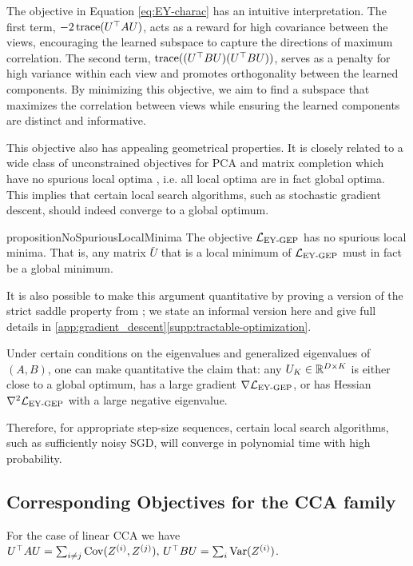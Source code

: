 The objective in Equation \eqref{eq:EY-charac} has an intuitive interpretation. The first term, $-2 \operatorname{trace}(U^\top A U)$, acts as a reward for high covariance between the views, encouraging the learned subspace to capture the directions of maximum correlation. The second term, $\operatorname{trace}((U^\top B U)(U^\top B U))$, serves as a penalty for high variance within each view and promotes orthogonality between the learned components. By minimizing this objective, we aim to find a subspace that maximizes the correlation between views while ensuring the learned components are distinct and informative.

This objective also has appealing geometrical properties. 
It is closely related to a wide class of unconstrained objectives for PCA and matrix completion which have no spurious local optima \citep{ge_no_2017}, i.e. all local optima are in fact global optima. 
This implies that certain local search algorithms, such as stochastic gradient descent, should indeed converge to a global optimum.

\begin{restatable}{proposition}{NoSpuriousLocalMinima}\label{prop:no-spurious}
    The objective $\mathcal{L}_\text{EY-GEP}$ has no spurious local minima.
    That is, any matrix $\bar{U}$ that is a local minimum of $\mathcal{L}_\text{EY-GEP}$ must in fact be a global minimum.
\end{restatable}

It is also possible to make this argument quantitative by proving a version of the strict saddle property from \citet{ge_no_2017,ge2015escaping}; we state an informal version here and give full details in \ref{app:gradient_descent}\ref{supp:tractable-optimization}.

\begin{corollary}
    Under certain conditions on the eigenvalues and generalized eigenvalues of $(A,B)$, one can make quantitative the claim that:
    any $U_K \in \mathbb{R}^{D \times K}$ is either close to a global optimum, has a large gradient $\nabla \mathcal{L}_\text{EY-GEP}$, or has Hessian $\nabla^2 \mathcal{L}_\text{EY-GEP}$ with a large negative eigenvalue.
    
    Therefore, for appropriate step-size sequences, certain local search algorithms, such as sufficiently noisy SGD, will converge in polynomial time with high probability.
\end{corollary}

\subsection{Corresponding Objectives for the CCA family}
For the case of linear CCA we have $U^\top A U = \sum_{i \neq j} \mathrm{Cov}(Z^{(i)}, Z^{(j)}),\,  U^\top B U = \sum_{i} \mathrm{Var}(Z^{(i)})$. 

